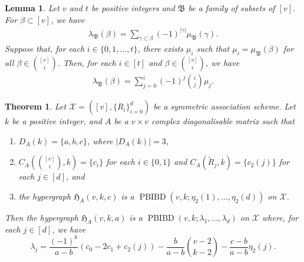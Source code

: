 \documentclass[10pt,a4paper]{amsart}
\newtheorem{lemma}{Lemma}
\newtheorem{theorem}{Theorem}
\begin{document}
\begin{lemma}
    \label{lem:lambda}
        Let $v$ and $t$ be positive integers and $\mathfrak B$ be a family of subsets of $[v]$. 
    For $\beta\subset [v]$, we have
    \begin{align*}
\lambda_\mathfrak B(\beta)=\sum_{\gamma \subset \beta}(-1)^{|\gamma|} \mu_\mathfrak B(\gamma).
\end{align*}
Suppose that, for each $i \in \{0,1,\dots,t\}$, there exists $\mu_i$ such that $\mu_i = \mu_\mathfrak B(\beta)$ for all $\beta \in \binom{[v]}{i}$. 
Then, for each $i \in [t]$ and $\beta \in \binom{[v]}{i}$, we have
\begin{align*}
    \lambda_\mathfrak B(\beta)=\sum_{j=0}^i (-1)^j \binom{i}{j}\mu_j.
\end{align*}
\end{lemma}

\begin{theorem}\label{thm:pbibd2}
Let $\mathcal{X}=([v],\{R_i\}_{i=0}^d)$ be a symmetric association scheme. 
Let $k$ be a positive integer, and $A$ be a $v\times v$ complex diagonalisable matrix such that  
\begin{enumerate}
    \item $D_A(k)=\{a,b,c\}$, where $|D_A(k)| = 3$,
    \item $C_A \left (\binom{[v]}{i},k \right) = \{c_i\}$ for each $i \in \{0,1\}$ and $C_A(\tilde{R}_j,k) = \{c_2(j)\}$ for each $j \in [d]$, and 
    \item %
    the hypergraph $\mathfrak H_{A}(v,k,c)$  is a $\operatorname{PBIBD}(v,k;\eta_2(1),\dots,\eta_2(d))$ on $\mathcal{X}$.
\end{enumerate}
Then the hypergraph $\mathfrak H_{A}(v,k,a)$ 
is a $\operatorname{PBIBD}(v,k;\lambda_1,\dots,\lambda_d)$ on $\mathcal{X}$ where, for each $j \in [d]$, we have
\[
\lambda_j=\frac{(-1)^k}{a-b}\left(c_0-2c_1+c_{2}(j)\right)-\frac{b}{a-b}\binom{v-2}{k-2}-\frac{c-b}{a-b}\eta_2(j).
\]
\end{theorem}
\end{document}

